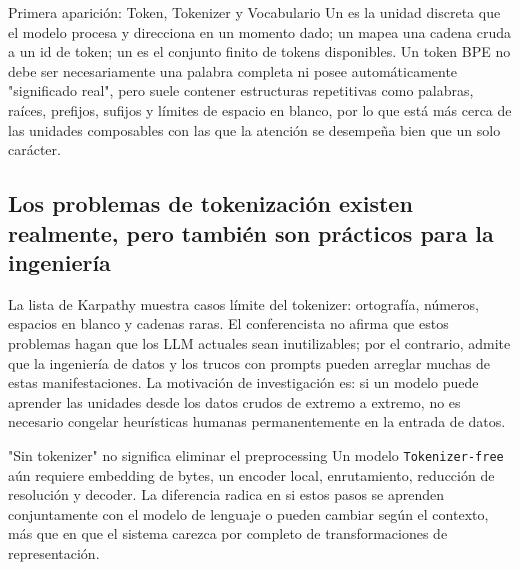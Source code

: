 
\begin{knowledgebox}{Primera aparición: Token, Tokenizer y Vocabulario}
Un  es la unidad discreta que el modelo procesa y direcciona en un momento dado; un  mapea una cadena cruda a un id de token; un  es el conjunto finito de tokens disponibles. Un token BPE no debe ser necesariamente una palabra completa ni posee automáticamente "significado real", pero suele contener estructuras repetitivas como palabras, raíces, prefijos, sufijos y límites de espacio en blanco, por lo que está más cerca de las unidades composables con las que la atención se desempeña bien que un solo carácter.
\end{knowledgebox}

\subsection{Los problemas de tokenización existen realmente, pero también son prácticos para la ingeniería}

La lista de Karpathy muestra casos límite del tokenizer: ortografía, números, espacios en blanco y cadenas raras. El conferencista no afirma que estos problemas hagan que los LLM actuales sean inutilizables; por el contrario, admite que la ingeniería de datos y los trucos con prompts pueden arreglar muchas de estas manifestaciones. La motivación de investigación es: si un modelo puede aprender las unidades desde los datos crudos de extremo a extremo, no es necesario congelar heurísticas humanas permanentemente en la entrada de datos.



\begin{warningbox}{"Sin tokenizer" no significa eliminar el preprocessing}
Un modelo \texttt{Tokenizer-free} aún requiere embedding de bytes, un encoder local, enrutamiento, reducción de resolución y decoder. La diferencia radica en si estos pasos se aprenden conjuntamente con el modelo de lenguaje o pueden cambiar según el contexto, más que en que el sistema carezca por completo de transformaciones de representación.
\end{warningbox}

